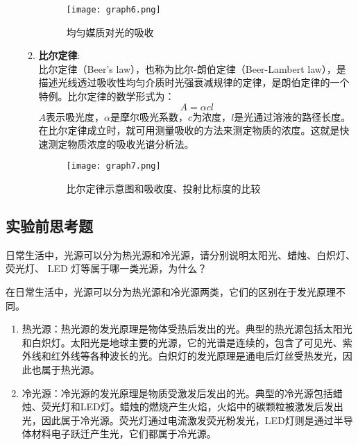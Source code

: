 \documentclass[dvipsnames, svgnames,a4paper,11pt]{article}
\begin{document}
\begin{enumerate}
\begin{enumerate}
					\begin{figure}[htbp]
						\centering
						\texttt{[image: graph6.png]}
						\caption{均匀媒质对光的吸收}
						\label{fig:graph6}
					\end{figure}
					
				\item \textbf{比尔定律}:\\
					比尔定律（Beer's law），也称为比尔-朗伯定律（Beer-Lambert law），是描述光线透过吸收性均匀介质时光强衰减规律的定律，是朗伯定律的一个特例。比尔定律的数学形式为：
					\[ A = \alpha c l \]
					$A$表示吸光度，$\alpha$是摩尔吸光系数，$c$为浓度，$l$是光通过溶液的路径长度。
					在比尔定律成立时，就可用测量吸收的方法来测定物质的浓度。这就是快速测定物质浓度的吸收光谱分析法。
					
					\begin{figure}[htbp]
						\centering
						\texttt{[image: graph7.png]}
						\caption{比尔定律示意图和吸收度、投射比标度的比较}
						\label{fig:graph7}
					\end{figure}
					
				
			\end{enumerate}
		
	\end{enumerate}


\subsection{实验前思考题}
	\begin{question}
		日常生活中，光源可以分为热光源和冷光源，请分别说明太阳光、蜡烛、白炽灯、荧光灯、 LED 灯等属于哪一类光源，为什么？
	\end{question}
	
	在日常生活中，光源可以分为热光源和冷光源两类，它们的区别在于发光原理不同。
	\begin{enumerate}
		\item 热光源：热光源的发光原理是物体受热后发出的光。典型的热光源包括太阳光和白炽灯。太阳光是地球主要的光源，它的光谱是连续的，包含了可见光、紫外线和红外线等各种波长的光。白炽灯的发光原理是通电后灯丝受热发光，因此也属于热光源。
		
		\item 冷光源：冷光源的发光原理是物质受激发后发出的光。典型的冷光源包括蜡烛、荧光灯和LED灯。蜡烛的燃烧产生火焰，火焰中的碳颗粒被激发后发出光，因此属于冷光源。荧光灯通过电流激发荧光粉发光，LED灯则是通过半导体材料电子跃迁产生光，它们都属于冷光源。
	\end{enumerate}
	
\end{document}
